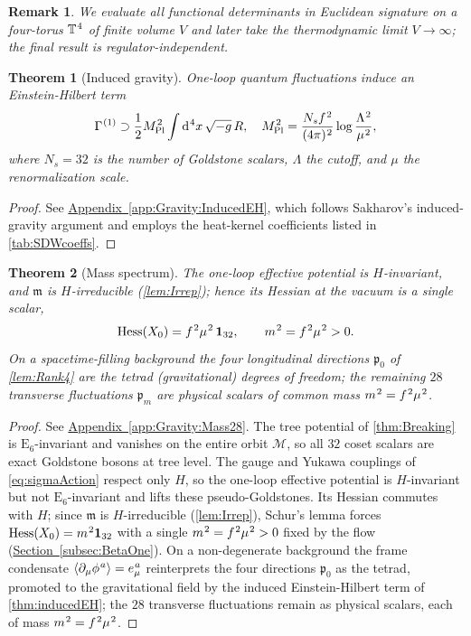 \documentclass[pdflatex,sn-mathphys-num]{sn-jnl}
\theoremstyle{thmstyleone}
\newtheorem{theorem}{Theorem}
\theoremstyle{thmstyletwo}%
\newtheorem{remark}{Remark}%
\theoremstyle{thmstylethree}%
\newcommand{\E}[1]{\mathrm{E_{#1}}}
\newcommand{\M}{\mathcal{M}}
\newcommand{\ESix}{\E{6}}
\newcommand{\sm}{\hspace{.065em}}
\newcommand{\appref}[1]{\hyperref[#1]{Appendix~\ref*{#1}}}
\newcommand{\subsecref}[1]{\hyperref[#1]{Section~\ref*{#1}}}
\newcommand{\smexp}[1]{^{\sm #1}}
\newcommand{\Hess}[1]{\operatorname{Hess}}
\newcommand{\dv}[1]{\mathrm{d}\smexp{#1}}
\begin{document}
\begin{remark}
We evaluate all functional determinants in Euclidean signature on a
four-torus $\mathbb T\smexp{4}$ of finite volume $V$ and later take the
thermodynamic limit $V\to\infty$; the final result is
regulator-independent.
\end{remark}

\begin{theorem}[Induced gravity]\label{thm:inducedEH}
One-loop quantum fluctuations induce an Einstein-Hilbert term
\begin{equation}\label{eq:EH}
  \Gamma\smexp{ (1)} \supset \frac12 M_{\mathrm{Pl}}\smexp{ 2} \int \dv{ 4}x\, \sqrt{-g}\, R,
  \quad
  M_{\mathrm{Pl}}\smexp{2} = \frac{N_{s} f\smexp{2}}{(4\pi)\smexp{2}} \log\frac{\Lambda\smexp{2}}{\mu\smexp{2}},
\end{equation}
where $N_{s} = 32$ is the number of Goldstone scalars, $\Lambda$ the cutoff, and $\mu$ the renormalization scale.
\end{theorem}

\begin{proof}
See \appref{app:Gravity:InducedEH}, which follows Sakharov’s induced-gravity argument and employs the heat-kernel coefficients listed in \autoref{tab:SDWcoeffs}.
\end{proof}

\begin{theorem}[Mass spectrum]
\label{thm:Mass28}
The one-loop effective potential is $H$-invariant, and $\mathfrak m$ is
$H$-irreducible (\autoref{lem:Irrep}); hence its Hessian at the vacuum is a
single scalar,
\[
  \Hess V(X_{0})=f\smexp{2}\mu\smexp{2}\,\mathbf 1_{32},
  \qquad
  m\smexp{2}=f\smexp{2}\mu\smexp{2}>0.
\]
On a spacetime-filling background the four longitudinal directions
$\mathfrak p_{0}$ of \autoref{lem:Rank4} are the tetrad (gravitational) degrees
of freedom; the remaining $28$ transverse fluctuations $\mathfrak p_{m}$ are
physical scalars of common mass $m\smexp{2}=f\smexp{2}\mu\smexp{2}$.
\end{theorem}

\begin{proof}
See \appref{app:Gravity:Mass28}. The tree potential of \autoref{thm:Breaking}
is $\ESix$-invariant and vanishes on the entire orbit $\M$, so all $32$ coset
scalars are exact Goldstone bosons at tree level. The gauge and Yukawa
couplings of \eqref{eq:sigmaAction} respect only $H$, so the one-loop effective
potential is $H$-invariant but not $\ESix$-invariant and lifts these
pseudo-Goldstones. Its Hessian commutes with $H$; since $\mathfrak m$ is
$H$-irreducible (\autoref{lem:Irrep}), Schur's lemma forces
$\Hess V(X_{0})=m\smexp{2}\mathbf 1_{32}$ with a single
$m\smexp{2}=f\smexp{2}\mu\smexp{2}>0$ fixed by the flow
(\subsecref{subsec:BetaOne}). On a non-degenerate background the frame
condensate $\langle\partial_\mu\phi\smexp{a}\rangle=e_\mu\smexp{a}$ reinterprets
the four directions $\mathfrak p_{0}$ as the tetrad, promoted to the
gravitational field by the induced Einstein-Hilbert term of
\autoref{thm:inducedEH}; the $28$ transverse fluctuations remain as physical
scalars, each of mass $m\smexp{2}=f\smexp{2}\mu\smexp{2}$.
\end{proof}
\end{document}
